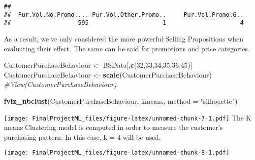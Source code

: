 \documentclass[
]{article}
\newenvironment{Shaded}{\begin{snugshade}}{\end{snugshade}}
\newcommand{\CommentTok}[1]{\textcolor[rgb]{0.56,0.35,0.01}{\textit{#1}}}
\newcommand{\DataTypeTok}[1]{\textcolor[rgb]{0.13,0.29,0.53}{#1}}
\newcommand{\DecValTok}[1]{\textcolor[rgb]{0.00,0.00,0.81}{#1}}
\newcommand{\KeywordTok}[1]{\textcolor[rgb]{0.13,0.29,0.53}{\textbf{#1}}}
\newcommand{\NormalTok}[1]{#1}
\newcommand{\OperatorTok}[1]{\textcolor[rgb]{0.81,0.36,0.00}{\textbf{#1}}}
\newcommand{\StringTok}[1]{\textcolor[rgb]{0.31,0.60,0.02}{#1}}
\begin{document}
\begin{verbatim}
## 
##  Pur.Vol.No.Promo.... Pur.Vol.Other.Promo..     Pur.Vol.Promo.6.. 
##                   595                     1                     4
\end{verbatim}

As a result, we've only considered the more powerful Selling
Propositions when evaluating their effect. The same can be said for
promotions and price categories.

\begin{Shaded}
\begin{Highlighting}[]
\NormalTok{CustomerPurchaseBehaviour <-}\StringTok{ }\NormalTok{BSData[,}\KeywordTok{c}\NormalTok{(}\DecValTok{32}\NormalTok{,}\DecValTok{33}\NormalTok{,}\DecValTok{34}\NormalTok{,}\DecValTok{35}\NormalTok{,}\DecValTok{36}\NormalTok{,}\DecValTok{45}\NormalTok{)]}
\NormalTok{CustomerPurchaseBehaviour <-}\StringTok{ }\KeywordTok{scale}\NormalTok{(CustomerPurchaseBehaviour)}
\CommentTok{#View(CustomerPurchaseBehaviour)}

\KeywordTok{fviz_nbclust}\NormalTok{(CustomerPurchaseBehaviour, kmeans, }\DataTypeTok{method =} \StringTok{"silhouette"}\NormalTok{)}
\end{Highlighting}
\end{Shaded}

\texttt{[image: FinalProjectML\_files/figure-latex/unnamed-chunk-7-1.pdf]}
The K means Clustering model is computed in order to measure the
customer's purchasing pattern. In this case, k = 4 will be used.

\begin{Shaded}
\end{Shaded}

\texttt{[image: FinalProjectML\_files/figure-latex/unnamed-chunk-8-1.pdf]}
\end{document}
